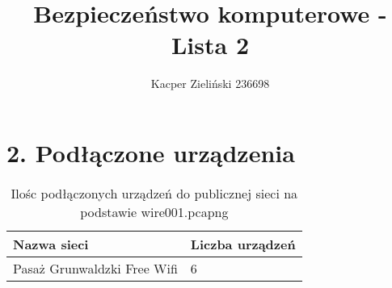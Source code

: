 \documentclass[12pt, a4paper]{article}
\begin{document}
\linespread{1.3}
\title{Bezpieczeństwo komputerowe - Lista 2}
\author{Kacper Zieliński 236698}
\date{}

\maketitle
\section*{2. Podłączone urządzenia}
\begin{table}[h]
    \centering
    \footnotesize
    \begin{tabular}{l | l}
        Nazwa sieci & Liczba urządzeń \\ \hline
        Pasaż Grunwaldzki Free Wifi & 6 \\
        \end{tabular}
    \caption{Ilośc podłączonych urządzeń do publicznej sieci na podstawie wire001.pcapng}
\end{table}
\end{document}
